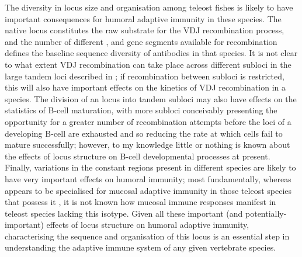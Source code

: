 The diversity in locus size and organisation among teleost fishes is likely to have important consequences for humoral adaptive immunity in these species. The native locus constitutes the raw substrate for the VDJ recombination process, and the number of different \vh, \dh and \jh gene segments available for recombination defines the baseline sequence diversity of antibodies in that species. It is not clear to what extent VDJ recombination can take place across different subloci in the large tandem loci described in ; if recombination between subloci is restricted, this will also have important effects on the kinetics of VDJ recombination in a species. The division of an \igh{} locus into tandem subloci may also have effects on the statistics of B-cell maturation, with more subloci conceivably presenting the opportunity for a greater number of recombination attempts before the \igh{} loci of a developing B-cell are exhausted and so reducing the rate at which cells fail to mature successfully; however, to my knowledge little or nothing is known about the effects of locus structure on B-cell developmental processes at present. Finally, variations in the constant regions present in different species are likely to have very important effects on humoral immunity; most fundamentally, whereas  appears to be specialised for mucosal adaptive immunity in those teleost species that possess it \parencite{zhang2010igtgut,fillatreau2013astonishing,xu2013igtskin}, it is not known how mucosal immune responses manifest in teleost species lacking this isotype. Given all these important (and potentially-important) effects of \igh{} locus structure on humoral adaptive immunity, characterising the sequence and organisation of this locus is an essential step in understanding the adaptive immune system of any given vertebrate species.

